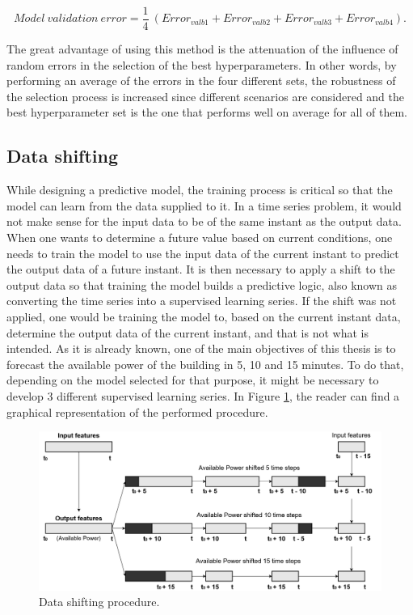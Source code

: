 \begin{equation}
     Model\ validation\ error =\frac {1}{4}\ (Error_{valb1} + Error_{valb2} + Error_{valb3} + Error_{valb4}).
\label{err_av}
\end{equation}

The great advantage of using this method is the attenuation of the influence of random errors in the selection of the best hyperparameters. In other words, by performing an average of the errors in the four different sets, the robustness of the selection process is increased since different scenarios are considered and the best hyperparameter set is the one that performs well on average for all of them.


\subsection{Data shifting}\label{chap3:subsec:data_shifting}

While designing a predictive model, the training process is critical so that the model can learn from the data supplied to it. In a time series problem, it would not make sense for the input data to be of the same instant as the output data. When one wants to determine a future value based on current conditions, one needs to train the model to use the input data of the current instant to predict the output data of a future instant. It is then necessary to apply a shift to the output data so that training the model builds a predictive logic, also known as converting the time series into a supervised learning series. If the shift was not applied, one would be training the model to, based on the current instant data, determine the output data of the current instant, and that is not what is intended. As it is already known, one of the main objectives of this thesis is to forecast the available power of the building in 5, 10 and 15 minutes. To do that, depending on the model selected for that purpose, it might be necessary to develop 3 different supervised learning series. In Figure \ref{shifting}, the reader can find a graphical representation of the performed procedure.


\begin{figure}[h!]
    \centering
    \begin{center}
    \includegraphics[width=1\textwidth]{Images/Data Shift.png}
    \caption{Data shifting procedure.}
    \label{shifting}
    \end{center}
\end{figure}

